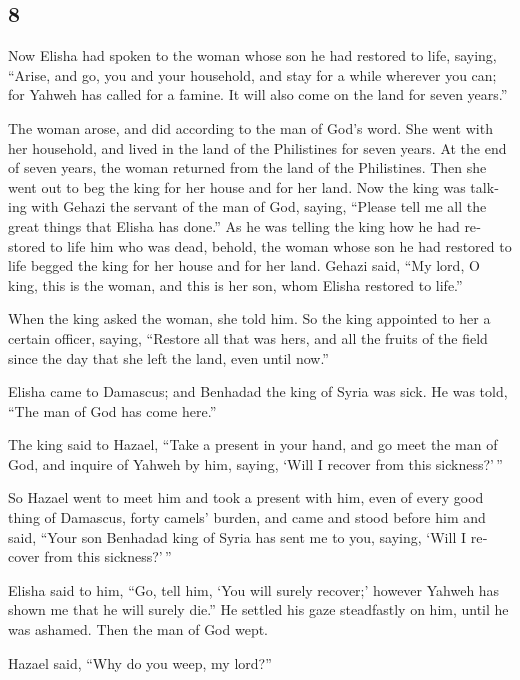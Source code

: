 \begin{paracol}{2}
\begin{otherlanguage}{english}
{\section{8}\label{section-15}}

 Now Elisha had spoken to the woman whose son he had
restored to life, saying, ``Arise, and go, you and your household, and
stay for a while wherever you can; for Yahweh has called for a famine.
It will also come on the land for seven years.''

 The woman arose, and did according to the man of God's
word. She went with her household, and lived in the land of the
Philistines for seven years.  At the end of seven years,
the woman returned from the land of the Philistines. Then she went out
to beg the king for her house and for her land.  Now the
king was talking with Gehazi the servant of the man of God, saying,
``Please tell me all the great things that Elisha has done.''
 As he was telling the king how he had restored to life
him who was dead, behold, the woman whose son he had restored to life
begged the king for her house and for her land. Gehazi said, ``My lord,
O king, this is the woman, and this is her son, whom Elisha restored to
life.''

 When the king asked the woman, she told him. So the king
appointed to her a certain officer, saying, ``Restore all that was hers,
and all the fruits of the field since the day that she left the land,
even until now.''

 Elisha came to Damascus; and Benhadad the king of Syria
was sick. He was told, ``The man of God has come here.''

 The king said to Hazael, ``Take a present in your hand,
and go meet the man of God, and inquire of Yahweh by him, saying, `Will
I recover from this sickness?'\,''

 So Hazael went to meet him and took a present with him,
even of every good thing of Damascus, forty camels' burden, and came and
stood before him and said, ``Your son Benhadad king of Syria has sent me
to you, saying, `Will I recover from this sickness?'\,''

 Elisha said to him, ``Go, tell him, `You will surely
recover;' however Yahweh has shown me that he will surely die.''
 He settled his gaze steadfastly on him, until he was
ashamed. Then the man of God wept.

 Hazael said, ``Why do you weep, my lord?''


\end{otherlanguage}
\end{paracol}
